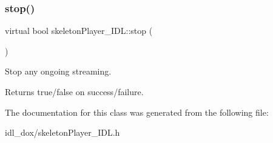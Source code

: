 \subsubsection{\texorpdfstring{stop()}{stop()}}
{\footnotesize\ttfamily virtual bool skeleton\+Player\+\_\+\+I\+D\+L\+::stop (\begin{DoxyParamCaption}{ }\end{DoxyParamCaption})\hspace{0.3cm}{\ttfamily [virtual]}}



Stop any ongoing streaming. 

\begin{DoxyReturn}{Returns}
true/false on success/failure. 
\end{DoxyReturn}


The documentation for this class was generated from the following file\+:\begin{DoxyCompactItemize}
\item 
idl\+\_\+dox/skeleton\+Player\+\_\+\+I\+D\+L.\+h\end{DoxyCompactItemize}
